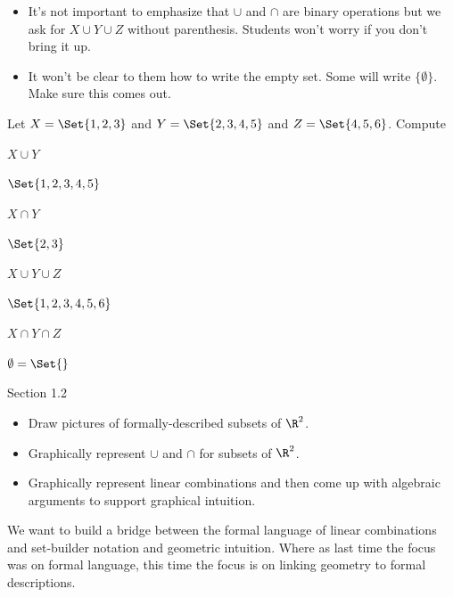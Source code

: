 \documentclass{problemset}
\begin{document}
	\question
	\begin{annotation}
		\begin{goals}
		\end{goals}

		\begin{notes}
			\begin{itemize}
				\item It's not important to emphasize that $\cup$ and $\cap$ are binary
			operations but we ask for $X\cup Y\cup Z$ without parenthesis.
			Students won't worry if you don't bring it up.
				\item It won't be clear to them how to write the empty set.
					Some will write $\{\emptyset\}$. Make sure this comes out.
			\end{itemize}
		\end{notes}
	\end{annotation}
	Let $X=\Set{1,2,3}$ and $Y=\Set{2,3,4,5}$ and $Z=\Set{4,5,6}$.  Compute
	\begin{parts}
		\item $X\cup Y$ \begin{solution}[inline]$\Set{1,2,3,4,5}$\end{solution}
		\item $X\cap Y$ \begin{solution}[inline]$\Set{2,3}$\end{solution}
		\item $X\cup Y\cup Z$ \begin{solution}[inline]$\Set{1,2,3,4,5,6}$\end{solution}
		\item $X\cap Y\cap Z$ \begin{solution}[inline]$\emptyset=\Set{}$\end{solution}
	\end{parts}


\begin{lesson}

	Section 1.2

	\begin{itemize}
		\item Draw pictures of formally-described subsets of $\R^2$.
		\item Graphically represent $\cup$ and $\cap$ for subsets of $\R^2$.
		\item Graphically represent linear combinations and then come up with
			algebraic arguments to support graphical intuition.
	\end{itemize}


	We want to build a bridge between the formal language of linear combinations
	and set-builder notation and geometric intuition. Where as last time
	the focus was on formal language, this time the focus is on linking geometry
	to formal descriptions.


\end{lesson}
\end{document}

